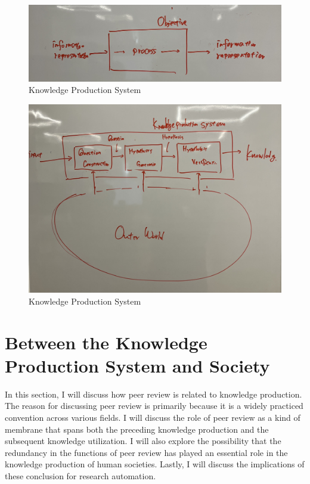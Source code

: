 \documentclass{book}
\begin{document}
\begin{figure}[htb]
    \centering
    \includegraphics[width=\linewidth]{figs/information_processing_system.jpg}
    \caption{Knowledge Production System}
    \label{fig:information_processing_system}
\end{figure}

\begin{figure}[htb]
    \centering
    \includegraphics[width=\linewidth]{figs/knowledge_production_system.jpg}
    \caption{Knowledge Production System}
    \label{fig:knowledge_production_system}
\end{figure}

\section{Between the Knowledge Production System and Society}
In this section, I will discuss how peer review is related to knowledge production. The reason for discussing peer review is primarily because it is a widely practiced convention across various fields. I will discuss the role of peer review as a kind of membrane that spans both the preceding knowledge production and the subsequent knowledge utilization. I will also explore the possibility that the redundancy in the functions of peer review has played an essential role in the knowledge production of human societies. Lastly, I will discuss the implications of these conclusion for research automation.
\end{document}
